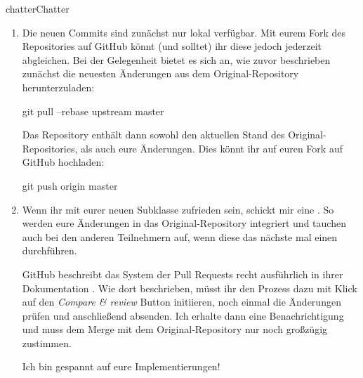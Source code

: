 \documentclass[parskip=half, final]{scrreprt}
\begin{document}
\begin{lecture}
\begin{exc}
\begin{excitem}{chatter}{Chatter}
\begin{enumerate}[label=\roman*.]
\begin{shlst}
# Falls ihr es noch nicht getan habt, solltet ihr euren Namen und eure GitHub Email der Git Konfiguration hinzufügen, sodass die Commits ordentlich eurem Account zugeordnet werden:
git config --global user.name "__dein_name__"
git config --global user.email __deine_github_email___
\end{shlst}

\begin{shlst}
git add filename # Achtet bitte darauf, nur Änderungen eurer Subklasse und nur wenn nötig Änderungen in anderen Dateien zu committen. Die project.pbxproj Datei enthält Informationen zu den Projektdateien - da ihr neue Dateien hinzugefügt habt, müsst ihr diese auch committen.
git status # häufig den Status prüfen
git commit -m"describe your changes here"
\end{shlst}

\item Die neuen Commits sind zunächst nur lokal verfügbar. Mit eurem Fork des Repositories auf GitHub könnt (und solltet) ihr diese jedoch jederzeit abgleichen. Bei der Gelegenheit bietet es sich an, wie zuvor beschrieben zunächst die neuesten Änderungen aus dem Original-Repository herunterzuladen:

\begin{shlst}
git pull --rebase upstream master
\end{shlst}

Das Repository enthält dann sowohl den aktuellen Stand des Original-Repositories, als auch eure Änderungen. Dies könnt ihr auf euren Fork auf GitHub hochladen:

\begin{shlst}
git push origin master
\end{shlst}

\item Wenn ihr mit eurer neuen  Subklasse zufrieden sein, schickt mir eine . So werden eure Änderungen in das Original-Repository integriert und tauchen auch bei den anderen Teilnehmern auf, wenn diese das nächste mal einen  durchführen.

GitHub beschreibt das System der Pull Requests recht ausführlich in ihrer Dokumentation . Wie dort beschrieben, müsst ihr den Prozess dazu mit Klick auf den \emph{Compare \& review} Button initiieren, noch einmal die Änderungen prüfen und anschließend absenden. Ich erhalte dann eine Benachrichtigung und muss dem Merge mit dem Original-Repository nur noch großzügig zustimmen.

Ich bin gespannt auf eure Implementierungen!

\end{enumerate}

\end{excitem}

\end{exc}


\end{lecture}
\end{document}
